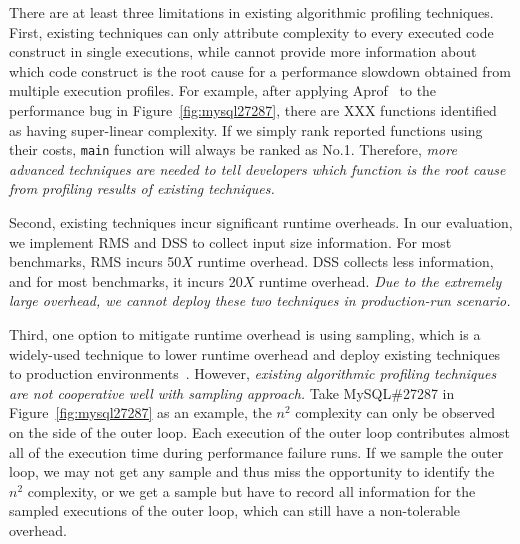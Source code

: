 %
There are at least three limitations in existing algorithmic profiling techniques. 
%
First, existing techniques can only 
attribute complexity to every executed code construct
in single executions, 
while cannot provide more information about 
which code construct is the root cause 
for a performance slowdown obtained from multiple 
execution profiles. 
For example, after applying Aprof~\cite{Aprof1,Aprof2} 
to the performance bug in Figure~\ref{fig:mysql27287}, 
there are {\color{red} XXX} functions identified 
as having super-linear complexity. 
If we simply rank reported functions using their costs, 
\texttt{main} function will always be ranked as No.1. 
Therefore, \emph{
more advanced techniques are needed to tell developers 
which function is the root cause from profiling results of existing techniques. 
}


Second, existing techniques incur significant runtime overheads. 
In our evaluation, we implement RMS and DSS to collect input size information. 
For most benchmarks, RMS incurs 50$X$ runtime overhead. 
DSS collects less information, and for most benchmarks, it incurs 20$X$ runtime overhead. 
\emph{Due to the extremely large overhead, 
we cannot deploy these two techniques in production-run scenario. }


Third, one option to mitigate runtime overhead is using
sampling, which is a widely-used technique to lower runtime overhead 
and deploy existing techniques to production 
environments~\cite{SongOOPSLA2014,liblit03,liblit05,CCI}. 
%
However, \emph{existing algorithmic profiling techniques are not cooperative well with
sampling approach.} 
Take MySQL\#27287 in Figure~\ref{fig:mysql27287} as an example,
the $n^2$ complexity can only be observed on the side of the outer loop. 
Each execution of the outer loop contributes almost all of 
the execution time during performance failure runs. 
If we sample the outer loop, 
we may not get any sample and thus miss the opportunity to 
identify the $n^2$ complexity, or we get a sample but have to 
record all 
information for the sampled executions of the outer loop, 
which can still  have a non-tolerable overhead. 


